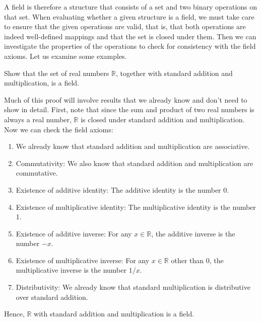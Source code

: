A field is therefore a structure that consists of a set and two binary operations on that set. When evaluating whether a given structure is a field, we must take care to ensure that the given operations are valid, that is, that both operations are indeed well-defined mappings and that the set is closed under them. Then we can investigate the properties of the operations to check for consistency with the field axioms. Let us examine some examples.

\begin{example}
Show that the set of real numbers $ \mathbb{R} $, together with standard addition and multiplication, is a field.
\end{example}
\begin{solution}
Much of this proof will involve results that we already know and don't need to show in detail. First, note that since the sum and product of two real numbers is always a real number, $ \mathbb{R} $ is closed under standard addition and multiplication. Now we can check the field axioms:
\begin{enumerate}
    \item We already know that standard addition and multiplication are associative.

    \item Commutativity: We also know that standard addition and multiplication are commutative.

    \item Existence of additive identity: The additive identity is the number 0.
    
    \item Existence of multiplicative identity: The multiplicative identity is the number 1.
    
    \item Existence of additive inverse: For any $ x\in\mathbb{R} $, the additive inverse is the number $ -x $.
    
    \item Existence of multiplicative inverse: For any $ x\in\mathbb{R} $ other than 0, the multiplicative inverse is the number $ 1/x $.
    
    \item Distributivity: We already know that standard multiplication is distributive over standard addition.
\end{enumerate}
Hence, $ \mathbb{R} $ with standard addition and multiplication is a field.
\end{solution}

